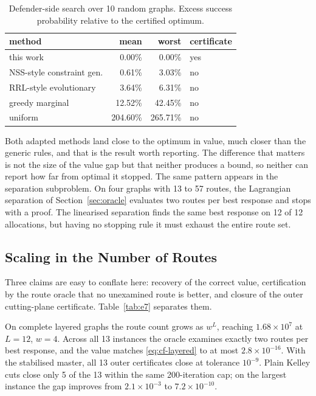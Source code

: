 \documentclass[10pt,a4paper,twoside]{article}
\theoremstyle{plain}
\theoremstyle{definition}
\begin{document}
\begin{table}[htbp]
\centering
\caption{Defender-side search over 10 random graphs. Excess success
probability relative to the certified optimum.}
\label{tab:e9}
\small
\begin{tabular}{lrrl}
\toprule
method & mean & worst & certificate\\
\midrule
this work                 & 0.00\%   & 0.00\%   & yes\\
NSS-style constraint gen. & 0.61\%   & 3.03\%   & no\\
RRL-style evolutionary    & 3.64\%   & 6.31\%   & no\\
greedy marginal           & 12.52\%  & 42.45\%  & no\\
uniform                   & 204.60\% & 265.71\% & no\\
\bottomrule
\end{tabular}
\end{table}

Both adapted methods land close to the optimum in value, much closer than the
generic rules, and that is the result worth reporting. The difference that
matters is not the size of the value gap but that neither produces a bound,
so neither can report how far from optimal it stopped. The same pattern
appears in the separation subproblem. On four graphs with 13 to 57 routes,
the Lagrangian separation of Section~\ref{sec:oracle} evaluates two routes
per best response and stops with a proof. The linearised separation finds the
same best response on 12 of 12 allocations, but having no stopping rule it
must exhaust the entire route set.

\subsection{Scaling in the Number of Routes}
\label{sec:results-scaling}

Three claims are easy to conflate here: recovery of the correct value,
certification by the route oracle that no unexamined route is better, and
closure of the outer cutting-plane certificate. Table~\ref{tab:e7} separates
them.

On complete layered graphs the route count grows as $w^L$, reaching
$1.68\times10^{7}$ at $L=12$, $w=4$. Across all 13 instances the oracle
examines exactly two routes per best response, and the value matches
\eqref{eq:cf-layered} to at most $2.8\times10^{-16}$. With the stabilised
master, all 13 outer certificates close at tolerance $10^{-9}$. Plain Kelley
cuts close only 5 of the 13 within the same 200-iteration cap; on the largest
instance the gap improves from $2.1\times10^{-3}$ to $7.2\times10^{-10}$.
\end{document}
